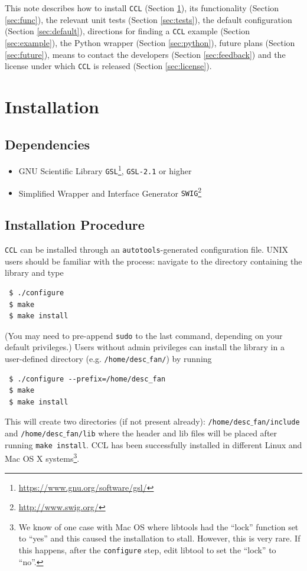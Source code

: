 \documentclass[\docopts]{\docclass}
\begin{document}
This note describes how to install {\tt CCL} (Section \ref{sec:install}), its functionality (Section \ref{sec:func}), the relevant unit tests (Section \ref{sec:tests}), the default configuration (Section \ref{sec:default}), directions for finding a {\tt CCL} example (Section \ref{sec:example}), the Python wrapper (Section \ref{sec:python}), future plans (Section \ref{sec:future}), means to contact the developers (Section \ref{sec:feedback}) and the license under which {\tt CCL} is released (Section \ref{sec:license}).


\section{Installation}
\label{sec:install}
\subsection{Dependencies}
\begin{itemize}
\item GNU Scientific Library {\tt GSL}\footnote{\url{https://www.gnu.org/software/gsl/}}, {\tt GSL-2.1} or higher
\item Simplified Wrapper and Interface Generator {\tt SWIG}\footnote{\url{http://www.swig.org/}}
\end{itemize}
\subsection{Installation Procedure}
{\tt CCL} can be installed through an {\tt autotools}-generated configuration file. UNIX users should be familiar with the process: navigate to the directory containing the library and type
\begin{verbatim}
 $ ./configure
 $ make
 $ make install
\end{verbatim}
(You may need to pre-append {\tt sudo} to the last command, depending on your default privileges.) Users without admin privileges can install the library in a user-defined directory (e.g. {\tt /home/desc$\_$fan/}) by running
\begin{verbatim}
 $ ./configure --prefix=/home/desc_fan
 $ make
 $ make install
\end{verbatim}
This will create two directories (if not present already): {\tt /home/desc$\_$fan/include} and {\tt /home/desc$\_$fan/lib} where the header and lib files will be placed after running {\tt make install}. CCL has been successfully installed in different Linux and Mac OS X systems\footnote{We know of one case with Mac OS where libtools had the ``lock'' function set to ``yes'' and this caused the installation to stall. However, this is very rare. If this happens, after the {\tt configure} step, edit libtool to set the ``lock'' to ``no''.}.
\end{document}
